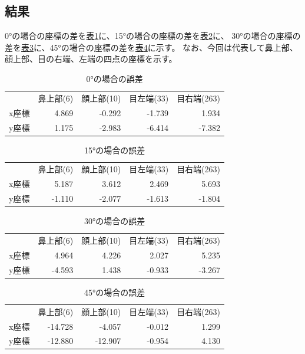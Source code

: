 \documentclass[]{jarticle}          %
\begin{document}
\subsection{結果}
0°の場合の座標の差を\hyperref[four]{表\ref{four}}に、15°の場合の座標の差を\hyperref[five]{表\ref{five}}に、
30°の場合の座標の差を\hyperref[six]{表\ref{six}}に、45°の場合の座標の差を\hyperref[seven]{表\ref{seven}}に示す。
なお、今回は代表して鼻上部、顔上部、目の右端、左端の四点の座標を示す。
\begin{table}[ht!]
  \begin{center}
    \begin{tabular}{lrrrr}
       & 鼻上部(6) & 顔上部(10) & 目左端(33) & 目右端(263) \\
      x座標 & 4.869 & -0.292 & -1.739 & 1.934 \\
      y座標 & 1.175 & -2.983 & -6.414 & -7.382
    \end{tabular}
    \caption{0°の場合の誤差}
    \label{four}
  \end{center}
\end{table}
\begin{table}[ht!]
  \begin{center}
    \begin{tabular}{lrrrr}
       & 鼻上部(6) & 顔上部(10) & 目左端(33) & 目右端(263) \\
      x座標 & 5.187 & 3.612 & 2.469 & 5.693 \\
      y座標 & -1.110 & -2.077 & -1.613 & -1.804 
    \end{tabular}
    \caption{15°の場合の誤差}
    \label{five}
  \end{center}
\end{table}
\begin{table}[ht!]
  \begin{center}
    \begin{tabular}{lrrrr}
       & 鼻上部(6) & 顔上部(10) & 目左端(33) & 目右端(263) \\
      x座標 & 4.964 & 4.226 & 2.027 & 5.235 \\
      y座標 & -4.593 & 1.438 & -0.933 & -3.267 
    \end{tabular}
    \caption{30°の場合の誤差}
    \label{six}
  \end{center}
\end{table}
\begin{table}[ht!]
  \begin{center}
    \begin{tabular}{lrrrr}
       & 鼻上部(6) & 顔上部(10) & 目左端(33) & 目右端(263) \\
      x座標 & -14.728 & -4.057 & -0.012 & 1.299 \\
      y座標 & -12.880 & -12.907 & -0.954 & 4.130
    \end{tabular}
    \caption{45°の場合の誤差}
    \label{seven}
  \end{center}
\end{table}
\end{document}
